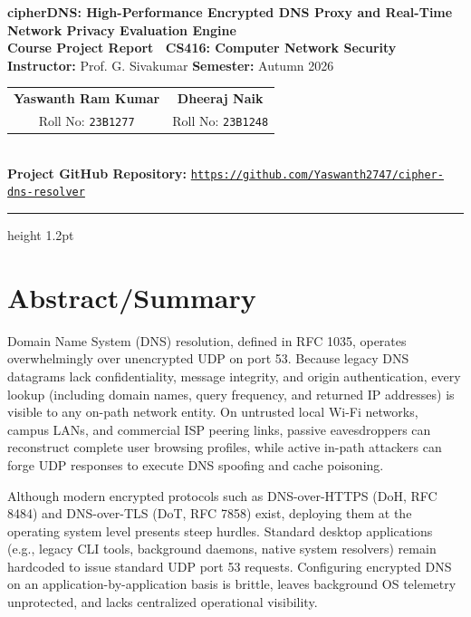 \documentclass[10pt,a4paper]{article}
\begin{document}
\begin{center}
    {\LARGE \textbf{\color{navyblue} cipherDNS: High-Performance Encrypted DNS Proxy and Real-Time Network Privacy Evaluation Engine}}\\[8pt]
    {\large \textbf{Course Project Report \textbar\ CS416: Computer Network Security}}\\[4pt]
    {\normalsize \textbf{Instructor:} Prof. G. Sivakumar \quad\textbullet\quad \textbf{Semester:} Autumn 2026}\\[10pt]
    
    \begin{tabular}{cc}
        \textbf{Yaswanth Ram Kumar} & \textbf{Dheeraj Naik} \\
        Roll No: \texttt{23B1277} & Roll No: \texttt{23B1248}
    \end{tabular}\\[8pt]
    {\small \textbf{Project GitHub Repository:} \href{https://github.com/Yaswanth2747/cipher-dns-resolver}{\texttt{https://github.com/Yaswanth2747/cipher-dns-resolver}}}
\end{center}

\vspace{-4pt}
\hrule height 1.2pt
\vspace{10pt}

\section{Abstract/Summary}
Domain Name System (DNS) resolution, defined in RFC 1035, operates overwhelmingly over unencrypted UDP on port 53. Because legacy DNS datagrams lack confidentiality, message integrity, and origin authentication, every lookup (including domain names, query frequency, and returned IP addresses) is visible to any on-path network entity. On untrusted local Wi-Fi networks, campus LANs, and commercial ISP peering links, passive eavesdroppers can reconstruct complete user browsing profiles, while active in-path attackers can forge UDP responses to execute DNS spoofing and cache poisoning.

Although modern encrypted protocols such as DNS-over-HTTPS (DoH, RFC 8484) and DNS-over-TLS (DoT, RFC 7858) exist, deploying them at the operating system level presents steep hurdles. Standard desktop applications (e.g., legacy CLI tools, background daemons, native system resolvers) remain hardcoded to issue standard UDP port 53 requests. Configuring encrypted DNS on an application-by-application basis is brittle, leaves background OS telemetry unprotected, and lacks centralized operational visibility.
\end{document}
